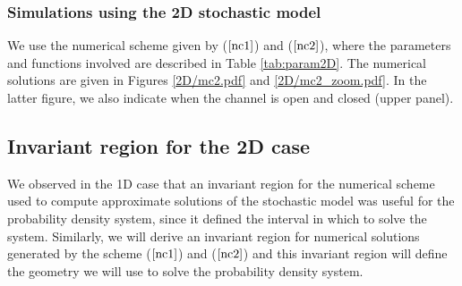 \subsubsection{Simulations using the 2D stochastic model}


We use the numerical scheme given by ($\ref{nc1}$) and ($\ref{nc2}$), where the parameters and functions involved are described in Table \ref{tab:param2D}. The numerical solutions are given in Figures \ref{2D/mc2.pdf} and \ref{2D/mc2_zoom.pdf}. In the latter figure, we also indicate when the channel is open and closed (upper panel).





\subsection{Invariant region for the 2D case \label{invariant2D}}

We observed in the 1D case that an invariant region for the numerical scheme used to compute approximate solutions of the stochastic model was useful for the probability density system, since it defined the interval in which to solve the system. Similarly, we will derive an invariant region for numerical solutions generated by the scheme  ($\ref{nc1}$) and ($\ref{nc2}$) and this invariant region will define the geometry we will use to solve the probability density system.


